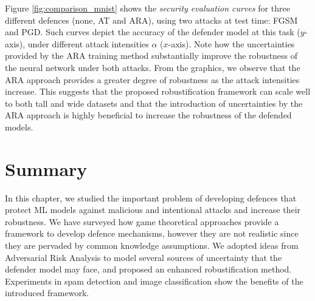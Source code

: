 Figure \ref{fig:comparison_mnist} shows the \emph{security evaluation curves} \parencite{BIGGIO2018317} for three different defences (none, AT and ARA), using two attacks at test time: FGSM and PGD. Such curves depict the accuracy of the defender model at this task ($y$-axis), under different attack intensities $\alpha$ ($x$-axis). Note how the uncertainties provided by the ARA training method substantially improve the robustness of the neural network under both attacks. From the graphics, we observe that the ARA approach provides a greater degree of robustness as the attack intensities increase. This suggests that the proposed robustification framework can scale well to both tall and wide datasets and that the introduction of uncertainties by the ARA approach is highly beneficial to increase the robustness of the defended models.





\section{Summary}

In this chapter, we studied the important problem of developing defences that protect ML models against malicious and intentional attacks and increase their robustness. We have surveyed how game theoretical approaches provide a framework to develop defence mechanisms, however they are not realistic since they are pervaded by common knowledge assumptions. We adopted ideas from Adversarial Risk Analysis to model several sources of uncertainty that the defender model may face, and proposed an enhanced robustification method. Experiments in spam detection and image classification show the benefits of the introduced framework.